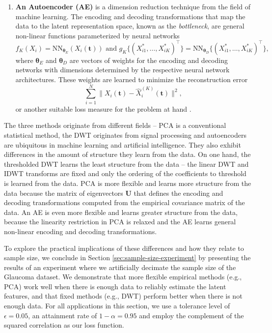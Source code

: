 \begin{enumerate}
    \item \textbf{An Autoencoder (AE)} \parencite{rumelhart_learning_1986} is a dimension reduction technique from the field of machine learning.
    The encoding and decoding transformations that map the data to the latent representation space, known as the \emph{bottleneck}, are general non-linear functions parameterized by neural networks
    $$
    f_K(X_i) = \text{NN}_{\boldsymbol{\theta}_E}(X_i (\mathbf{t})) \text{ and } g_K\big\{\left(X_{i1}^*, \dots,  X_{iK}^* \right)^\top\big\} = \text{NN}_{\boldsymbol{\theta}_D} \big\{\left(X_{i1}^*, \dots,  X_{iK}^* \right)^\top\big\},
    $$
    where $\boldsymbol{\theta}_E$ and $\boldsymbol{\theta}_D$ are vectors of weights for the encoding and decoding networks with dimensions determined by the respective neural network architectures.
    These weights are learned to minimize the reconstruction error
    $$
    \sum_{i=1}^N \bigg\| X_i (\mathbf{t}) - \widehat{X}_i^{(K)}(\mathbf{t}) \bigg\|^2,
    $$
    or another suitable loss measure for the problem at hand \parencite[e.g., binary cross-entropy for binary data, see][]{kalinowski_keras_2024}.
\end{enumerate}
The three methods originate from different fields -- PCA is a conventional statistical method, the DWT originates from signal processing and autoencoders are ubiquitous in machine learning and artificial intelligence.
They also exhibit differences in the amount of structure they learn from the data.
On one hand, the thresholded DWT learns the least structure from the data -- the linear DWT and IDWT transforms are fixed and only the ordering of the coefficients to threshold is learned from the data.
PCA is more flexible and learns more structure from the data because the matrix of eigenvectors $\mathbf{U}$ that defines the encoding and decoding transformations computed from the empirical covariance matrix of the data.
An AE is even more flexible and learns greater structure from the data, because the linearity restriction in PCA is relaxed and the AE learns general non-linear encoding and decoding transformations.

To explore the practical implications of these differences and how they relate to sample size, we conclude in Section \ref{sec:sample-size-experiment} by presenting the results of an experiment where we artificially decimate the sample size of the Glaucoma dataset.
We demonstrate that more flexible empirical methods (e.g., PCA) work well when there is enough data to reliably estimate the latent features, and that fixed methods (e.g., DWT) perform better when there is not enough data.
For all applications in this section, we use a tolerance level of $\epsilon = 0.05$, an attainment rate of $1 - \alpha=0.95$ and employ the complement of the squared correlation as our loss function.

